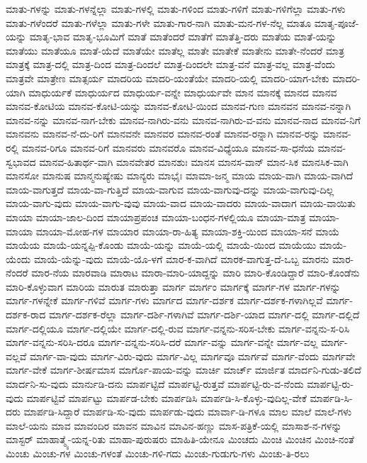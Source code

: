 {ಮಾತು-ಗಳನ್ನು
ಮಾತು-ಗಳನ್ನೆಲ್ಲಾ
ಮಾತು-ಗಳಲ್ಲಿ
ಮಾತು-ಗಳಿಂದ
ಮಾತು-ಗಳಿಗೆ
ಮಾತು-ಗಳಿಗೆಲ್ಲಾ
ಮಾತು-ಗಳು
ಮಾತು-ಗಳೆಂದರೆ
ಮಾತು-ಗಳೆಲ್ಲಾ
ಮಾತು-ಗಳೇ
ಮಾತು-ಗಾರ-ನಾಗಿ
ಮಾತು-ಮನ-ಗಳ-ನೆಲ್ಲ
ಮಾತೂ
ಮಾತೃ-ಪೂಜೆ-ಯನ್ನು
ಮಾತೃ-ಭಾವ
ಮಾತೃ-ಭೂಮಿಗೆ
ಮಾತೆ
ಮಾತೆಂದರೆ
ಮಾತೆಗೆ
ಮಾತೆತ್ತಿ-ದರು
ಮಾತೆಯ
ಮಾತೆ-ಯನ್ನು
ಮಾತೆಯು
ಮಾತೆಯೂ
ಮಾತೆ-ಯೆದೆ
ಮಾತೆಯೇ
ಮಾತೆಲ್ಲ
ಮಾತೇ
ಮಾತೇಕೆ
ಮಾತೇನು
ಮಾತೇ-ನೆಂದರೆ
ಮಾತ್ರ
ಮಾತ್ರಕ್ಕೆ
ಮಾತ್ರ-ದಲ್ಲಿ
ಮಾತ್ರ-ದಿಂದ
ಮಾತ್ರ-ದಿಂದಲೆ
ಮಾತ್ರ-ದಿಂದಲೇ
ಮಾತ್ರ-ವನೆ
ಮಾತ್ರ-ವಲ್ಲ
ಮಾತ್ರ-ವೆಂದು
ಮಾತ್ರವೇ
ಮಾತ್ರೇಣ
ಮಾತ್ಸರ್ಯ
ಮಾದರಿಯ
ಮಾದರಿ-ಯಂತೆಯೇ
ಮಾದರಿ-ಯಲ್ಲಿ
ಮಾದರಿ-ಯಾಗ-ಬೇಕು
ಮಾದರಿ-ಯಾಗಿ
ಮಾಧುರ್ಯಕೆ
ಮಾಧುರ್ಯದ
ಮಾಧುರ್ಯ-ವನ್ನೇ
ಮಾಧುರ್ಯವೇ
ಮಾನ
ಮಾನಕ್ಕೆ
ಮಾನದ
ಮಾನವ
ಮಾನವ-ಕೋಟಿಯ
ಮಾನವ-ಕೋಟಿ-ಯನ್ನು
ಮಾನವ-ಕೋಟಿ-ಯಿಂದ
ಮಾನವ-ಗುಣ
ಮಾನವನ
ಮಾನವ-ನನ್ನಾಗಿ
ಮಾನವ-ನನ್ನು
ಮಾನವ-ನಾಗ-ಬೇಕು
ಮಾನವ-ನಾಗಿರು-ವನು
ಮಾನವ-ನಾಗಿರು-ವ-ವನು
ಮಾನವ-ನಾದ
ಮಾನವ-ನಿಗೆ
ಮಾನವನು
ಮಾನವ-ನೆ-ದು-ರಿಗೆ
ಮಾನವನೇ
ಮಾನವರ
ಮಾನವ-ರಂತೆ
ಮಾನವ-ರನ್ನಾಗಿ
ಮಾನವ-ರನ್ನು
ಮಾನವ-ರಲ್ಲಿ
ಮಾನವ-ರಿಗೂ
ಮಾನವ-ರಿಗೆ
ಮಾನವರು
ಮಾನವರೊ
ಮಾನವ-ವಿಧ್ಯೆಯೂ
ಮಾನವ-ಸಾ-ಧನೆಯ
ಮಾನವ-ಸ್ವಭಾವದ
ಮಾನವ-ಹಿತಾರ್ಥ-ವಾಗಿ
ಮಾನವೇತರ
ಮಾನಶುಃ
ಮಾನಸ
ಮಾನಸ-ವಾನ್
ಮಾನ-ಸಿಕ
ಮಾನಸಿಕ-ವಾಗಿ
ಮಾನಸೋ
ಮಾನುಷ
ಮಾನ್ಮನುಷ್ಯೇಷು
ಮಾನ್ಯರು
ಮಾಭೈಃ
ಮಾಮಾ-ಜನ್ಮ
ಮಾಯ
ಮಾಯ-ವಾಗಿ
ಮಾಯ-ವಾಗಿದೆ
ಮಾಯ-ವಾಗುತ್ತದೆ
ಮಾಯ-ವಾ-ಗುತ್ತಿದೆ
ಮಾಯ-ವಾಗುವ
ಮಾಯ-ವಾಗುವು-ದನ್ನು
ಮಾಯ-ವಾಗುವು-ದಿಲ್ಲ
ಮಾಯ-ವಾಗು-ವುದು
ಮಾಯ-ವಾಗು-ವುವು
ಮಾಯ-ವಾದ
ಮಾಯ-ವಾದರು
ಮಾಯ-ವಾದಾಗ
ಮಾಯ-ವಾಯಿತು
ಮಾಯಾ
ಮಾಯಾ-ಜಾಲ-ದಿಂದ
ಮಾಯಾಪ್ರಪಂಚ
ಮಾಯಾ-ಬಂಧನ-ಗಳಲ್ಲಿಯೂ
ಮಾಯಾ-ಮಾತ್ರ
ಮಾಯಾ-ಮಾಯಾ
ಮಾಯಾ-ಮೋಹ-ಗಳ
ಮಾಯಾರ
ಮಾಯಾ-ರಾ-ಹಿತ್ಯ
ಮಾಯಾ-ಶಕ್ತಿ-ಯಿಂದ
ಮಾಯಾ-ಸನೆ
ಮಾಯೆ
ಮಾಯೆಯ
ಮಾಯೆ-ಯನ್ನಪ್ಪಿ-ಕೊಂಡು
ಮಾಯೆ-ಯನ್ನು
ಮಾಯೆ-ಯಲ್ಲಿ
ಮಾಯೆ-ಯಿಂದ
ಮಾಯೆಯು
ಮಾಯೆ-ಯೆಂದು
ಮಾಯೆ-ಯೆನ್ನು-ವುದು
ಮಾಯೆ-ಯೊ-ಳಗೆ
ಮಾರ-ಕ-ವಾಗಿದೆ
ಮಾರಕ-ವಾಗುತ್ತ-ದೆ-ಒಬ್ಬ
ಮಾರನು
ಮಾರ-ನೆಂದರೆ
ಮಾರ-ನೆಯ
ಮಾರವಾಡಿ
ಮಾರಾಟ
ಮಾರಾ-ಮಾರಿ-ಯಾದ್ದನ್ನು
ಮಾರಿ
ಮಾರಿ-ಕೊಂಡಿದ್ದಾರೆ
ಮಾರಿ-ಕೊಂಡೆನು
ಮಾರಿ-ಕೊಳ್ಳುವಾಗ
ಮಾರಿಯ
ಮಾರುತ
ಮಾರುತ್ತಾ
ಮಾರ್ಗ
ಮಾರ್ಗಂ
ಮಾರ್ಗಕ್ಕೆ
ಮಾರ್ಗ-ಗಳ
ಮಾರ್ಗ-ಗಳನ್ನು
ಮಾರ್ಗ-ಗಳನ್ನೇಕೆ
ಮಾರ್ಗ-ಗಳಿವೆ
ಮಾರ್ಗ-ಗಳು
ಮಾರ್ಗದ
ಮಾರ್ಗ-ದರ್ಶಕ
ಮಾರ್ಗ-ದರ್ಶಕ-ಗಳಾಗಿಲ್ಲವೆ
ಮಾರ್ಗ-ದರ್ಶಕ-ರಾದ
ಮಾರ್ಗ-ದರ್ಶಕ-ರೆಲ್ಲಾ
ಮಾರ್ಗ-ದರ್ಶಿ-ಗಳಾಗಿವೆ
ಮಾರ್ಗ-ದರ್ಶಿ-ಯಾದ
ಮಾರ್ಗ-ದಲ್ಲಿ
ಮಾರ್ಗ-ದಲ್ಲಿದೆ
ಮಾರ್ಗ-ದಲ್ಲಿಯೂ
ಮಾರ್ಗ-ದಲ್ಲಿಯೇ
ಮಾರ್ಗ-ದಲ್ಲಿ-ರುವ
ಮಾರ್ಗ-ವನ್ನನು-ಸರಿಸ-ಬೇಕು
ಮಾರ್ಗ-ವನ್ನನು-ಸ-ರಿಸಿ
ಮಾರ್ಗ-ವನ್ನನು-ಸರಿಸಿ-ದರೂ
ಮಾರ್ಗ-ವನ್ನನು-ಸರಿಸಿ-ದರೆ
ಮಾರ್ಗ-ವನ್ನು
ಮಾರ್ಗ-ವನ್ನೇ
ಮಾರ್ಗ-ವಲ್ಲ
ಮಾರ್ಗ-ವಲ್ಲವೆ
ಮಾರ್ಗ-ವಾ-ವುದು
ಮಾರ್ಗ-ವಿರು-ವುದು
ಮಾರ್ಗ-ವಿಲ್ಲ
ಮಾರ್ಗವೂ
ಮಾರ್ಗವೆ
ಮಾರ್ಗ-ವೆಂದು
ಮಾರ್ಗವೇ
ಮಾರ್ಗ-ವೇಕೆ
ಮಾರ್ಗ-ಶೀರ್ಷಮಾಸ
ಮಾರ್ಗೊ-ಪಾಯ-ವನ್ನು
ಮಾರ್ಚಿ
ಮಾರ್ಚ್
ಮಾರ್ಜಿತ
ಮಾರ್ದನಿ-ಗುಡು-ತಲಿದೆ
ಮಾರ್ದನಿ-ಸು-ವುದು
ಮಾರ್ನುಡಿ-ದನು
ಮಾರ್ಪಟ್ಟಿದೆ
ಮಾರ್ಪಟ್ಟಿ-ರುತ್ತವೆ
ಮಾರ್ಪಟ್ಟಿ-ರು-ವ-ನೆಂದು
ಮಾರ್ಪಟ್ಟಿ-ರು-ವುದು
ಮಾರ್ಪಟ್ಟಿವೆ
ಮಾರ್ಪಟ್ಟು
ಮಾರ್ಪಡ-ಬೇಕು
ಮಾರ್ಪಡಿಸಿ
ಮಾರ್ಪಡಿ-ಸಿ-ಕೊಳ್ಳು-ವುದಿಲ್ಲ-ವೇಕೆ
ಮಾರ್ಪಡಿ-ಸಿ-ದರು
ಮಾರ್ಪಡಿ-ಸಿದ್ದಾರೆ
ಮಾರ್ಪಡಿ-ಸು-ವುದು
ಮಾರ್ಪಡು-ವುದು
ಮಾರ್ವಾ-ಡಿ-ಗಳೂ
ಮಾಲ
ಮಾಲೆ
ಮಾಲೆ-ಗಳು
ಮಾಲೆ-ಯನು
ಮಾವ
ಮಾವಂದಿರ
ಮಾವನ
ಮಾವಿನ
ಮಾವಿನ-ಹಣ್ಣು
ಮಾಸ-ಪತ್ರಿಕೆ-ಯಲ್ಲಿ
ಮಾಸಾಶ-ನ-ಗಳನ್ನು
ಮಾಸ್ಟರ್
ಮಾಹಾತ್ಮ್ಯೆ-ಯನ್ನ-ರಿತು
ಮಾಹಾ-ಪುರುಷರು
ಮಾಹಿತಿ-ಯೇನೂ
ಮಿಂಚದು
ಮಿಂಚಿ
ಮಿಂಚಿನ
ಮಿಂಚಿ-ನಂತೆ
ಮಿಂಚು
ಮಿಂಚು-ಗಳ
ಮಿಂಚು-ಗಳಂತೆ
ಮಿಂಚು-ಗಳಿ-ಗದು
ಮಿಂಚು-ಗುಡುಗು-ಗಳು
ಮಿಂಚು-ತಿ-ರಲು
}
